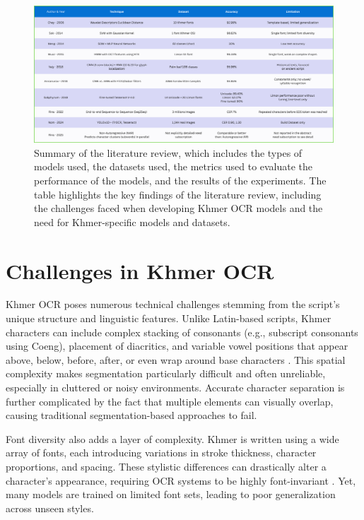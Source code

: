 \begin{figure}[ht]
    \centering
    \includegraphics[width=\textwidth]{figures/summary_literature_review.png}
    \caption{Summary of the literature review, which includes the types of models used, 
    the datasets used, the metrics used to evaluate the performance of the models, 
    and the results of the experiments. The table highlights the key findings of the 
    literature review, including the challenges faced when developing Khmer OCR models 
    and the need for Khmer-specific models and datasets.}
    \label{fig:summary_literature_review}
\end{figure}

\section{Challenges in Khmer OCR}
\label{sec:datasets}

Khmer OCR poses numerous technical challenges stemming from the script's unique structure and 
linguistic features. Unlike Latin-based scripts, Khmer characters can include complex stacking 
of consonants (e.g., subscript consonants using Coeng), placement of diacritics, and variable vowel 
positions that appear above, below, before, after, or even wrap around base characters \citep{buoy2021seq2seq}. 
This spatial complexity makes segmentation particularly difficult and often unreliable, 
especially in cluttered or noisy environments. Accurate character separation is further complicated 
by the fact that multiple elements can visually overlap, causing traditional segmentation-based 
approaches to fail.

Font diversity also adds a layer of complexity. Khmer is written using a wide array of fonts, each 
introducing variations in stroke thickness, character proportions, and spacing. These stylistic 
differences can drastically alter a character's appearance, requiring OCR systems to be highly 
font-invariant \citep{buoy2021seq2seq}. Yet, many models are trained on limited font sets, leading 
to poor generalization across unseen styles.

